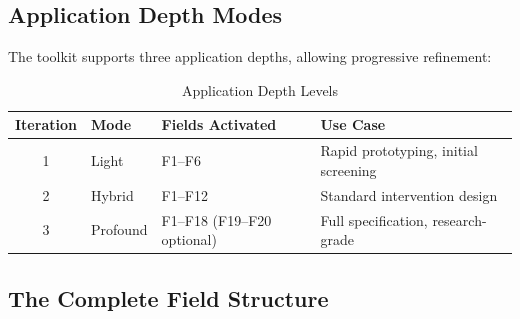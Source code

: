\subsection{Application Depth Modes}

The toolkit supports three application depths, allowing progressive refinement:

\begin{table}[htbp]
\centering
\caption{Application Depth Levels}
\label{tab:hhh-depths}
\renewcommand{\arraystretch}{1.3}
\begin{tabular}{@{}clll@{}}
\toprule
\textbf{Iteration} & \textbf{Mode} & \textbf{Fields Activated} & \textbf{Use Case} \\
\midrule
1 & Light & F1--F6 & Rapid prototyping, initial screening \\
2 & Hybrid & F1--F12 & Standard intervention design \\
3 & Profound & F1--F18 (F19--F20 optional) & Full specification, research-grade \\
\bottomrule
\end{tabular}
\end{table}

\subsection{The Complete Field Structure}

